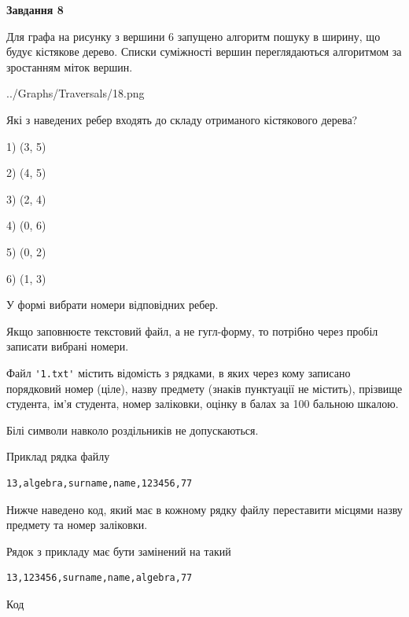 \documentclass[12pt, ukrainian]{article}
\def\code#1{\Verb!#1!}
\begin{document}
{\begin {large}
{\begin {center}\textbf{Завдання 8}\end {center}}\par
Для графа на рисунку з вершини 6 запущено алгоритм пошуку в ширину, що будує кістякове дерево. Списки суміжності вершин переглядаються алгоритмом за зростанням міток вершин.\par
\begin{center}
	{../Graphs/Traversals/18.png}
\end{center}
\par Які з наведених ребер входять до складу отриманого кістякового дерева?\par
1) (3, 5)\par
2) (4, 5)\par
3) (2, 4)\par
4) (0, 6)\par
5) (0, 2)\par
6) (1, 3)\par
{\vskip 15pt} У формі вибрати номери відповідних ребер.


Якщо заповнюєте текстовий файл, а не гугл-форму, то потрібно через пробіл записа\-ти вибрані номери.\par
\newpage


Файл \code{'1.txt'} містить відомість з рядками, в яких через кому записано поряд\-ковий номер (ціле), назву предмету (знаків пунктуації не містить), прізвище студента, ім'я студента, номер заліковки, оцінку в балах за 100 бальною шкалою.

Білі символи навколо роздільників не допускаються.

Приклад рядка файлу



\begin{verbatim}
13,algebra,surname,name,123456,77
\end{verbatim}


Нижче наведено код, який має в кожному рядку файлу переставити місцями назву предмету та номер заліковки.

Рядок з прикладу має бути замінений на такий



\begin{verbatim}
13,123456,surname,name,algebra,77
\end{verbatim}




Код




\end{large}}
\end{document}
